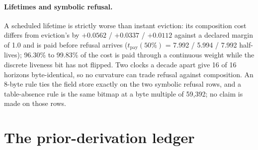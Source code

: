 \documentclass{article} %
\begin{document}
\paragraph{Lifetimes and symbolic refusal.} A scheduled lifetime is strictly worse than instant
eviction: its composition cost differs from eviction's by $+0.0562$ / $+0.0337$ / $+0.0112$ against a
declared margin of 1.0 and is paid before refusal arrives ($t_{\text{pay}}(50\%)$ = 7.992 / 5.994 /
7.992 half-lives); 96.30\% to 99.83\% of the cost is paid through a continuous weight while the
discrete liveness bit has not flipped. %
Two clocks a decade apart give 16 of 16 horizons byte-identical, so no curvature can trade refusal
against composition. An 8-byte rule ties the field store exactly on the two symbolic refusal rows,
and a table-absence rule is the same bitmap at a byte multiple of 59,392; no claim is made on those
rows. %

\section{The prior-derivation ledger}
\label{app:shorts}
\end{document}
